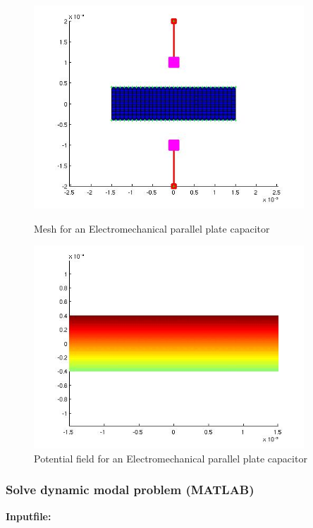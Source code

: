 \begin{figure}[htbp]
\centering
\includegraphics[height = 3in]{fig/em_pp_capacitor_mesh.jpg}
\caption{Mesh for an Electromechanical parallel plate capacitor}
\label{fig:ElectromechanicalParallelPlateCapacitorFixMesh}
\includegraphics[height = 3in]{fig/em_pp_capacitor_field.jpg}
\caption{Potential field for an Electromechanical parallel plate capacitor}
\label{fig:ElectromechanicalParallelPlateCapacitorPotentialField}
\end{figure}

\clearpage
\subsubsection*{Solve dynamic modal problem (MATLAB)}
\begin{flushleft}
  \textbf{Inputfile:}
  \\
\end{flushleft}
\hspace{1in}
{\footnotesize
{}
}

